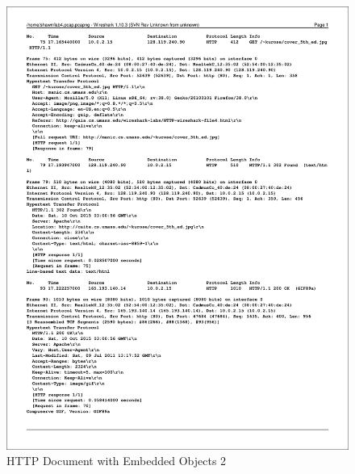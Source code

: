 \documentclass[titlepage, paper=a4, fontsize=11pt]{scrartcl} %
\numberwithin{equation}{section} %
\numberwithin{figure}{section} %
\numberwithin{table}{section} %
\begin{document}
\begin{figure}[!ht]
    \includegraphics[width=\textwidth]{images/refobj2.pdf}
    \caption{HTTP Document with Embedded Objects 2}
    \label{fig:refobj2}
\end{figure}
\end{document}
